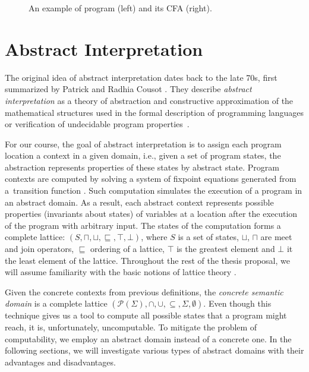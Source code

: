 \begin{figure}
\begin{minipage}[t]{0.48\textwidth}
\begin{tikzpicture}[node distance=1.1em]
\end{tikzpicture}
\end{minipage}

\caption{An example of \llvm program (left) and its CFA (right).}
\label{fig:cfa}
\end{figure}

\section{Abstract Interpretation}
\label{sec:abstraction}

The original idea of abstract interpretation dates back to the late 70s, first
summarized by Patrick and Radhia Cousot \cite{Cousot1977}.
They describe \emph{abstract interpretation} as a theory of abstraction and
constructive approximation of the mathematical structures used in the formal
description of programming languages or verification of undecidable program
properties~\cite{Cousot2012}.

For our course, the goal of abstract interpretation is to assign each program
location a context in a given domain, i.e., given a set of program states, the
abstraction represents properties of these states by abstract state. Program
contexts are computed by solving a system of fixpoint equations generated from
a~transition function \cite{Cousot1977}. Such computation simulates the
execution of a program in an abstract domain. As a result, each abstract context represents possible properties (invariants about states) of variables at a location after the execution of the program
\label{sec:symbolic}
with arbitrary input. The states of the computation forms
a complete lattice: $(S, \sqcap, \sqcup, \sqsubseteq, \top, \bot)$, where $S$
is a set of states, $\sqcup$, $\sqcap$ are meet and join operators,
$\sqsubseteq$ ordering of a lattice, $\top$ is the greatest element and $\bot$
it the least element of the lattice. Throughout the rest of the thesis proposal,
we will assume familiarity with the basic notions of lattice theory
\cite{Birkhoff1940}.

Given the concrete contexts from previous definitions, the \emph{concrete
semantic domain} is a complete lattice $(\mathcal{P}(\Sigma), \cap, \cup,
\subseteq, \Sigma, \emptyset)$. Even though this technique gives us a tool to
compute all possible states that a program might reach, it is, unfortunately,
uncomputable. To mitigate the problem of computability, we employ an abstract
domain instead of a concrete one. In the following sections, we will
investigate various types of abstract domains with their advantages and
disadvantages.

